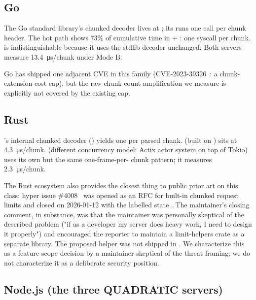 \subsection{Go}
\label{sec:pf-go}

The Go standard library's  chunked decoder lives
at ; its
 runs one
 call per chunk header. The hot path
shows 73\% of cumulative time in
 + : one syscall per chunk.
 is indistinguishable because it uses the stdlib decoder
unchanged. Both servers measure
\SI{13.4}{\micro\second}/chunk under Mode B.

Go has shipped one adjacent CVE in this family
(CVE-2023-39326~\cite{cve_2023_39326_go}: a chunk-extension cost
cap), but the raw-chunk-count amplification we measure is
explicitly not covered by the existing cap.

\subsection{Rust}
\label{sec:pf-rust}

's internal chunked decoder
() yields one 
per parsed chunk.  (built on ) sits at
\SI{4.3}{\micro\second}/chunk.  (different
concurrency model: Actix actor system on top of Tokio) uses its
own  but the same one-frame-per-
chunk pattern; it measures \SI{2.3}{\micro\second}/chunk.

The Rust ecosystem also provides the closest thing to public
prior art on this class: hyper issue \#4008~\cite{hyper_4008}
was opened as an RFC for built-in chunked request limits and
closed  on 2026-01-12 with the labelled state
. The maintainer's closing comment, in
substance, was that the maintainer was personally skeptical of
the described problem ("if as a developer my server does heavy
work, I need to design it properly") and encouraged the reporter
to maintain a limit-helpers crate as a separate library.
The proposed  helper was not
shipped in . We characterize this as a
feature-scope decision by a maintainer skeptical of the threat
framing; we do not characterize it as a deliberate security
position.

\subsection{Node.js (the three QUADRATIC servers)}
\label{sec:pf-node}

